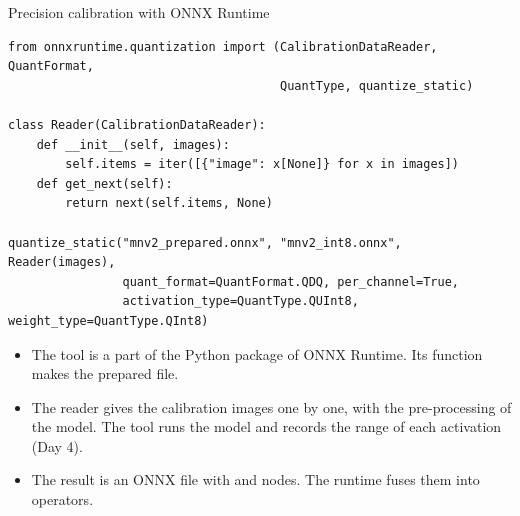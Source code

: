 \begin{frame}[fragile]{Precision calibration with ONNX Runtime}
\begin{lstlisting}[style=python]
from onnxruntime.quantization import (CalibrationDataReader, QuantFormat,
                                      QuantType, quantize_static)

class Reader(CalibrationDataReader):
    def __init__(self, images):
        self.items = iter([{"image": x[None]} for x in images])
    def get_next(self):
        return next(self.items, None)

quantize_static("mnv2_prepared.onnx", "mnv2_int8.onnx", Reader(images),
                quant_format=QuantFormat.QDQ, per_channel=True,
                activation_type=QuantType.QUInt8, weight_type=QuantType.QInt8)
\end{lstlisting}
  \small
  \begin{itemize}
    \item The tool is a part of the Python package of ONNX Runtime. Its
          function  makes the prepared file.
    \item The reader gives the calibration images one by one, with the
          pre-processing of the model. The tool runs the model and records
          the range of each activation (Day 4).
    \item The result is an ONNX file with  and
           nodes. The runtime fuses them into
           operators.
  \end{itemize}
\end{frame}

